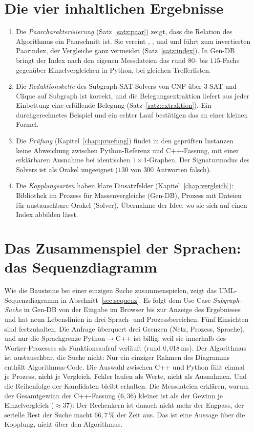 \section{Die vier inhaltlichen Ergebnisse}

\begin{enumerate}
	\item Die \emph{Paarcharakterisierung} (Satz~\ref{satz:paar}) zeigt, dass die Relation des Algorithmus ein Paarschnitt ist. Sie vereint , ,  und  und führt zum invertierten Paarindex, der Vergleiche ganz vermeidet (Satz~\ref{satz:index}). In Gen-DB bringt der Index nach den eigenen Messdateien das rund $80$- bis $115$-Fache gegenüber Einzelvergleichen in Python, bei gleichen Trefferlisten.
	\item Die \emph{Reduktionskette} des Subgraph-SAT-Solvers von CNF über 3-SAT und Clique auf Subgraph ist korrekt, und die Belegungsextraktion liefert aus jeder Einbettung eine erfüllende Belegung (Satz~\ref{satz:extraktion}). Ein durchgerechnetes Beispiel und ein echter Lauf bestätigen das an einer kleinen Formel.
	\item Die \emph{Prüfung} (Kapitel~\ref{chap:pruefung}) findet in den geprüften Instanzen keine Abweichung zwischen Python-Referenz und C++-Fassung, mit einer erklärbaren Ausnahme bei identischen $1{\times}1$-Graphen. Der Signaturmodus des Solvers ist als Orakel ungeeignet ($130$ von $300$ Antworten falsch).
	\item Die \emph{Kopplungsarten} haben klare Einsatzfelder (Kapitel~\ref{chap:vergleich}): Bibliothek im Prozess für Massenvergleiche (Gen-DB), Prozess mit Dateien für austauschbare Orakel (Solver), Übernahme der Idee, wo sie sich auf einen Index abbilden lässt.
\end{enumerate}

\section{Das Zusammenspiel der Sprachen: das Sequenzdiagramm}

Wie die Bausteine bei einer einzigen Suche zusammenspielen, zeigt das UML-Sequenzdiagramm in Abschnitt~\ref{sec:sequenz}. Es folgt dem Use Case \emph{Subgraph-Suche} in Gen-DB von der Eingabe im Browser bis zur Anzeige des Ergebnisses und hat neun Lebenslinien in drei Sprach- und Prozessbereichen. Fünf Einsichten sind festzuhalten. Die Anfrage überquert drei Grenzen (Netz, Prozess, Sprache), und nur die Sprachgrenze Python$\to$C++ ist billig, weil sie innerhalb des Worker-Prozesses als Funktionsaufruf verläuft (rund $0{,}018$\,ms). Der Algorithmus ist austauschbar, die Suche nicht: Nur ein einziger Rahmen des Diagramms enthält Algorithmus-Code. Die Auswahl zwischen C++ und Python fällt einmal je Prozess, nicht je Vergleich. Fehler laufen als Werte, nicht als Ausnahmen. Und die Reihenfolge der Kandidaten bleibt erhalten. Die Messdateien erklären, warum der Gesamtgewinn der C++-Fassung ($6{,}36$) kleiner ist als der Gewinn je Einzelvergleich ($\approx37$): Der Rechenkern ist danach nicht mehr der Engpass, der serielle Rest der Suche macht $66{,}7\,\%$ der Zeit aus. Das ist eine Aussage über die Kopplung, nicht über den Algorithmus.

